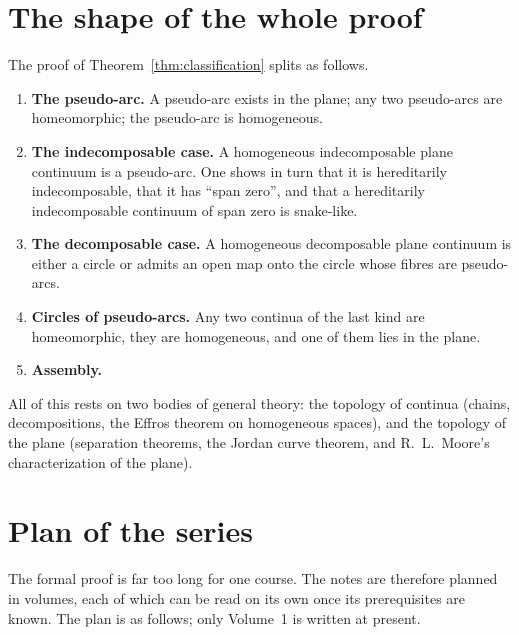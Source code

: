 \section{The shape of the whole proof}

The proof of Theorem~\ref{thm:classification} splits as follows.
\begin{enumerate}
\item \textbf{The pseudo-arc.} A pseudo-arc exists in the plane; any two pseudo-arcs are
homeomorphic; the pseudo-arc is homogeneous.
\item \textbf{The indecomposable case.} A homogeneous indecomposable plane continuum is a
pseudo-arc. One shows in turn that it is hereditarily indecomposable, that it has ``span
zero'', and that a hereditarily indecomposable continuum of span zero is snake-like.
\item \textbf{The decomposable case.} A homogeneous decomposable plane continuum is either
a circle or admits an open map onto the circle whose fibres are pseudo-arcs.
\item \textbf{Circles of pseudo-arcs.} Any two continua of the last kind are homeomorphic,
they are homogeneous, and one of them lies in the plane.
\item \textbf{Assembly.}
\end{enumerate}
All of this rests on two bodies of general theory: the topology of continua (chains,
decompositions, the Effros theorem on homogeneous spaces), and the topology of the plane
(separation theorems, the Jordan curve theorem, and R.~L.~Moore's characterization of the
plane).

\section{Plan of the series}

The formal proof is far too long for one course. The notes are therefore planned in
volumes, each of which can be read on its own once its prerequisites are known. The plan
is as follows; only Volume~1 is written at present.

